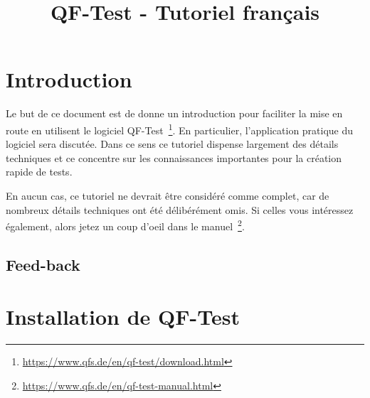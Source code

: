 \documentclass{article}
\begin{document}
\title{QF-Test - Tutoriel français}
\maketitle

\section{Introduction}
\par{
Le but de ce document est de donne un introduction pour faciliter la mise en route en utilisent le logiciel
QF-Test~\footnote{\url{https://www.qfs.de/en/qf-test/download.html}}. En particulier, l'application pratique
du logiciel sera discutée. Dans ce sens ce tutoriel dispense largement des détails techniques et ce concentre
sur les connaissances importantes pour la création rapide de tests.
}
\par{
En aucun cas, ce tutoriel ne devrait être considéré comme complet, car de nombreux détails techniques ont été
délibérément omis. Si celles vous intéressez également, alors jetez un coup d'oeil dans le
manuel~\footnote{\url{https://www.qfs.de/en/qf-test-manual.html}}.
}

\subsection{Feed-back}
\par{

}

\section{Installation de QF-Test}
\end{document}

